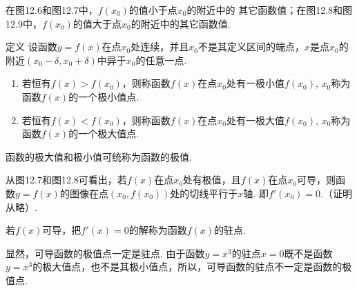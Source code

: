 在图12.6和图12.7中，$f(x_0)$的值小于点$x_0$的附近中的
其它函数值；在图12.8和图12.9中，$f(x_0)$的值大于点$x_0$的附近中的其它函数值.

\begin{thm}
{定义} 设函数$y=f(x)$在点$x_0$处连续，并且$x_0$不是其定义区间的端点，$x$是点$x_0$的附近$(x_0-\delta,x_0+\delta)$中异于$x_0$的任意一点.
\begin{enumerate}[(1)]
\item 若恒有$f(x)>f(x_0)$，则称函数$f(x)$在点$x_0$处有一极小值$f(x_0)$, $x_0$称为函数$f(x)$的一个极小值点.
\item 若恒有$f(x)<f(x_0)$，则称函数$f(x)$在点$x_0$处有一极大值$f(x_0)$, $x_0$称为函数$f(x)$的一个极大值点.
\end{enumerate}
函数的极大值和极小值可统称为函数的极值.
\end{thm}


从图12.7和图12.8可看出，若$f(x)$在点$x_0$处有极值，且$f(x)$在点$x_0$可导，则函数$y=f(x)$的图像在点$(x_0,f(x_0))$处的切线平行于$x$轴. 即$f'(x_0)=0$.（证明从略）.

若$f(x)$可导，把$f'(x)=0$的解称为函数$f(x)$的驻点.

显然，可导函数的极值点一定是驻点. 由于函数$y=x^3$的驻点$x=0$既不是函数$y=x^3$的极大值点，也不是其极小值点，所以，可导函数的驻点不一定是函数的极值点.


